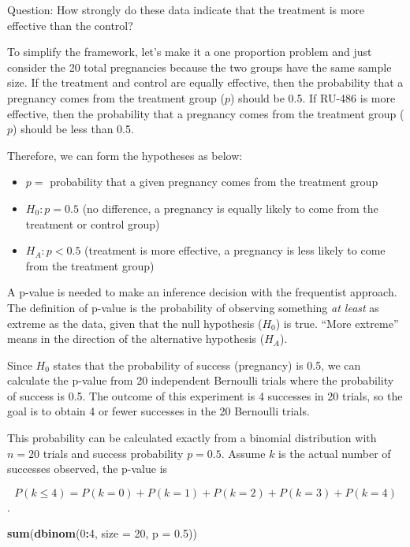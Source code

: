 \documentclass[]{book}
\newenvironment{Shaded}{\begin{snugshade}}{\end{snugshade}}
\newcommand{\KeywordTok}[1]{\textcolor[rgb]{0.13,0.29,0.53}{\textbf{#1}}}
\newcommand{\DataTypeTok}[1]{\textcolor[rgb]{0.13,0.29,0.53}{#1}}
\newcommand{\DecValTok}[1]{\textcolor[rgb]{0.00,0.00,0.81}{#1}}
\newcommand{\FloatTok}[1]{\textcolor[rgb]{0.00,0.00,0.81}{#1}}
\newcommand{\OperatorTok}[1]{\textcolor[rgb]{0.81,0.36,0.00}{\textbf{#1}}}
\newcommand{\NormalTok}[1]{#1}
\theoremstyle{definition}
\theoremstyle{definition}
\theoremstyle{remark}
\begin{document}
Question: How strongly do these data indicate that the treatment is more
effective than the control?

To simplify the framework, let's make it a one proportion problem and
just consider the 20 total pregnancies because the two groups have the
same sample size. If the treatment and control are equally effective,
then the probability that a pregnancy comes from the treatment group
(\(p\)) should be 0.5. If RU-486 is more effective, then the probability
that a pregnancy comes from the treatment group (\(p\)) should be less
than 0.5.

Therefore, we can form the hypotheses as below:

\begin{itemize}
\item
  \(p =\) probability that a given pregnancy comes from the treatment
  group
\item
  \(H_0: p = 0.5\) (no difference, a pregnancy is equally likely to come
  from the treatment or control group)
\item
  \(H_A: p < 0.5\) (treatment is more effective, a pregnancy is less
  likely to come from the treatment group)
\end{itemize}

A p-value is needed to make an inference decision with the frequentist
approach. The definition of p-value is the probability of observing
something \emph{at least} as extreme as the data, given that the null
hypothesis (\(H_0\)) is true. ``More extreme'' means in the direction of
the alternative hypothesis (\(H_A\)).

Since \(H_0\) states that the probability of success (pregnancy) is 0.5,
we can calculate the p-value from 20 independent Bernoulli trials where
the probability of success is 0.5. The outcome of this experiment is 4
successes in 20 trials, so the goal is to obtain 4 or fewer successes in
the 20 Bernoulli trials.

This probability can be calculated exactly from a binomial distribution
with \(n=20\) trials and success probability \(p=0.5\). Assume \(k\) is
the actual number of successes observed, the p-value is

\[P(k \leq 4) = P(k = 0) + P(k = 1) + P(k = 2) + P(k = 3) + P(k = 4)\].

\begin{Shaded}
\begin{Highlighting}[]
\KeywordTok{sum}\NormalTok{(}\KeywordTok{dbinom}\NormalTok{(}\DecValTok{0}\OperatorTok{:}\DecValTok{4}\NormalTok{, }\DataTypeTok{size =} \DecValTok{20}\NormalTok{, }\DataTypeTok{p =} \FloatTok{0.5}\NormalTok{))}
\end{Highlighting}
\end{Shaded}
\end{document}
